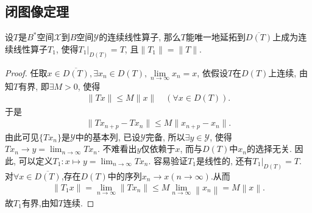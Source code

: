 \documentclass[../../main.tex]{subfiles}%
\begin{document}
\subsection{闭图像定理}

\begin{theorem}
设$T$是$B^*$空间$\mathscr{X}$到$B$空间$\mathscr{Y}$的连续线性算子, 那么$T$能唯一地延拓到$\overline{D(T)}$上成为连续线性算子$T_1$, 使得$T_1|_{D(T)}=T$, 且$\|T_1\|=\|T\|$.
\end{theorem}
\begin{proof}

任取$x\in\overline{D(T)},\exists x_n\in D(T),\lim\limits_{n\to\infty}x_n=x$, 依假设$T$在$D(T)$上连续, 由知$T$有界, 即$\exists M>0$, 使得
\begin{align*}
\|Tx\|\leqslant M\|x\|\quad(\forall x\in D(T)).
\end{align*}
于是
\begin{align*}
\|Tx_{n+p}-Tx_n\|\leqslant M\|x_{n+p}-x_n\|.
\end{align*}
由此可见$\{Tx_n\}$是$\mathscr{Y}$中的基本列, 已设$\mathscr{Y}$完备, 所以$\exists y\in\mathscr{Y}$, 使得$Tx_n\to y=\lim_{n\to \infty}Tx_n$. 不难看出$y$仅依赖于$x$, 而与$D(T)$中$x_n$的选择无关. 因此, 可以定义$T_1:x\mapsto y= \lim_{n\to \infty}Tx_n$. 容易验证$T_1$是线性的, 还有$T_1|_{D(T)}=T$. 对$\forall x\in\overline{D(T)}$,存在$D(T)$中的序列$x_n\rightarrow x\left( n\rightarrow \infty \right)$.从而
\begin{align*}
\left\| T_1x \right\| =\underset{n\rightarrow \infty}{\lim}\left\| Tx_n \right\| \leqslant M\underset{n\rightarrow \infty}{\lim}\left\| x_n \right\| =M\left\| x \right\| .
\end{align*}
故$T_1$有界,由知$T$连续.

\end{proof}
\end{document}
